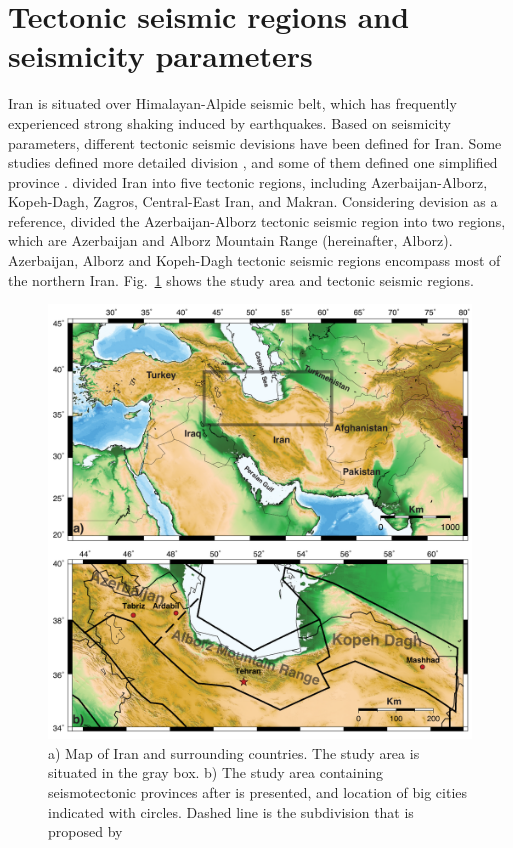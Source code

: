 
\section{Tectonic seismic regions and seismicity parameters}
\noindent
Iran is situated over Himalayan-Alpide seismic belt, which has frequently experienced strong shaking induced by earthquakes. Based on seismicity parameters, different tectonic seismic devisions have been defined for Iran.  Some studies defined more detailed division \citep{Nowroozi1976, Tavakoli1999}, and some of them defined one simplified province \citep{Stocklin1968, Takin1972, Berberian1976}. \citet{Mirzaei1998} divided Iran into five tectonic regions, including Azerbaijan-Alborz, Kopeh-Dagh, Zagros, Central-East Iran, and Makran. Considering \citet{Mirzaei1998} devision as a reference, \citet{Karimiparidari2013} divided the Azerbaijan-Alborz tectonic seismic region into two regions, which are Azerbaijan and Alborz Mountain Range (hereinafter, Alborz). Azerbaijan, Alborz and Kopeh-Dagh tectonic seismic regions encompass most of the northern Iran.  Fig.~\ref{fig:study_region} shows the study area and tectonic seismic regions. \\

\begin{figure} [ht]
\centering
\includegraphics[scale=0.6]{figures/pdf/Figure01.pdf} 
\caption{a) Map of Iran and surrounding countries. The study area is situated in the gray box. b) The study area containing seismotectonic provinces after \citet{Mirzaei1998} is presented, and location of big cities indicated with circles. Dashed line is the subdivision that is proposed by \citet{Karimiparidari2013}}
\label{fig:study_region}
\end{figure}




